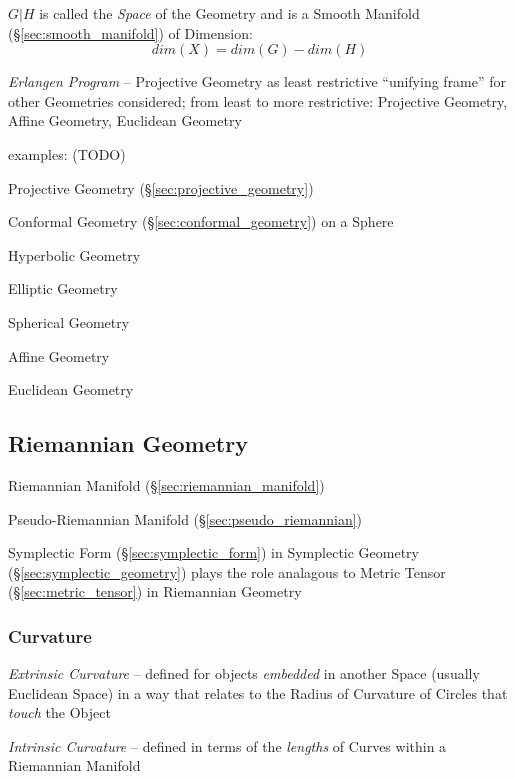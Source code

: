 $G|H$ is called the \emph{Space} of the Geometry and is a Smooth
Manifold (\S\ref{sec:smooth_manifold}) of Dimension:
\[
  dim(X) = dim(G) - dim(H)
\]

\emph{Erlangen Program} -- Projective Geometry as least restrictive
``unifying frame'' for other Geometries considered; from least to more
restrictive: Projective Geometry, Affine Geometry, Euclidean Geometry

examples: (TODO)

Projective Geometry (\S\ref{sec:projective_geometry})

Conformal Geometry (\S\ref{sec:conformal_geometry}) on a Sphere

Hyperbolic Geometry

Elliptic Geometry

Spherical Geometry

Affine Geometry

Euclidean Geometry



\subsection{Riemannian Geometry}\label{sec:riemannian_geometry}

Riemannian Manifold (\S\ref{sec:riemannian_manifold})

Pseudo-Riemannian Manifold (\S\ref{sec:pseudo_riemannian})

Symplectic Form (\S\ref{sec:symplectic_form}) in Symplectic Geometry
(\S\ref{sec:symplectic_geometry}) plays the role analagous to Metric Tensor
(\S\ref{sec:metric_tensor}) in Riemannian Geometry



\subsubsection{Curvature}\label{sec:reimannian_curvature}


\emph{Extrinsic Curvature} -- defined for objects \emph{embedded} in another
Space (usually Euclidean Space) in a way that relates to the Radius of
Curvature of Circles that \emph{touch} the Object

\emph{Intrinsic Curvature} -- defined in terms of the \emph{lengths} of Curves
within a Riemannian Manifold


